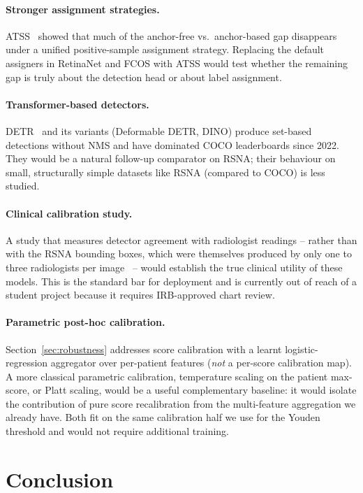 \documentclass[11pt,a4paper]{article}
\begin{document}
\paragraph{Stronger assignment strategies.}
ATSS~\cite{zhang2020atss} showed that much of the anchor-free vs.\ anchor-based gap disappears under a unified positive-sample assignment strategy. Replacing the default assigners in RetinaNet and FCOS with ATSS would test whether the remaining gap is truly about the detection head or about label assignment.

\paragraph{Transformer-based detectors.}
DETR~\cite{carion2020detr} and its variants (Deformable DETR, DINO) produce set-based detections without NMS and have dominated COCO leaderboards since 2022. They would be a natural follow-up comparator on RSNA; their behaviour on small, structurally simple datasets like RSNA (compared to COCO) is less studied.

\paragraph{Clinical calibration study.}
A study that measures detector agreement with radiologist readings -- rather than with the RSNA bounding boxes, which were themselves produced by only one to three radiologists per image~\cite{shih2019rsna} -- would establish the true clinical utility of these models. This is the standard bar for deployment and is currently out of reach of a student project because it requires IRB-approved chart review.

\paragraph{Parametric post-hoc calibration.}
Section~\ref{sec:robustness} addresses score calibration with a learnt logistic-regression aggregator over per-patient features (\emph{not} a per-score calibration map). A more classical parametric calibration, temperature scaling on the patient max-score, or Platt scaling, would be a useful complementary baseline: it would isolate the contribution of pure score recalibration from the multi-feature aggregation we already have. Both fit on the same calibration half we use for the Youden threshold and would not require additional training.

\section{Conclusion}
\label{sec:conclusion}
\end{document}
